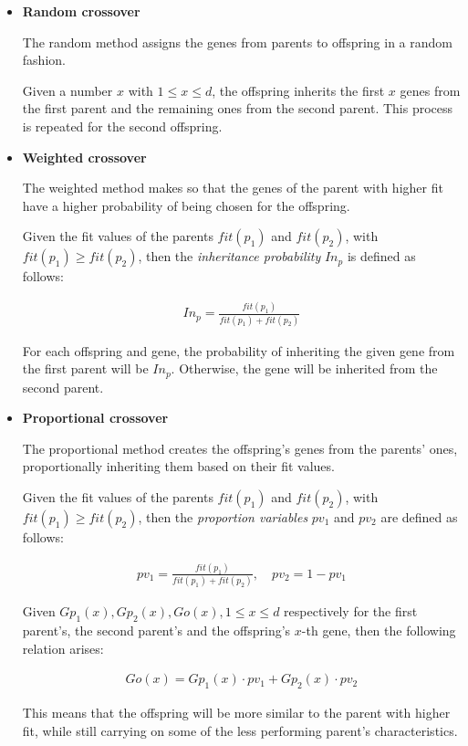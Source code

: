 \begin{itemize}[noitemsep]
	\item \textbf{Random crossover}
	
	The random method assigns the genes from parents to offspring in a random fashion.
	
	Given a number $x$ with $1 \le x \le d$,
	the offspring inherits the first $x$ genes from the first parent and
	the remaining ones from the second parent.
	This process is repeated for the second offspring.
	\item \textbf{Weighted crossover}
	
	The weighted method makes so that the genes of the parent with higher
	fit have a higher probability of being chosen for the offspring.
	
	Given the fit values of the parents $fit(p_1)$ and $fit(p_2)$,
	with $fit(p_1) \ge fit(p_2)$, then the \textit{inheritance probability} $In_p$
	is defined as follows:
	
	\begin{align*}
	In_p = \frac{fit(p_1)}{fit(p_1)+fit(p_2)}
	\end{align*}
	
	For each offspring and gene, the probability of inheriting the given gene
	from the first parent will be $In_p$. Otherwise, the gene will be inherited
	from the second parent.
	\item \textbf{Proportional crossover}
	
	The proportional method creates the offspring's genes from the parents' ones,
	proportionally inheriting them based on their fit values.
	
	Given the fit values of the parents $fit(p_1)$ and $fit(p_2)$,
	with $fit(p_1) \ge fit(p_2)$, then the \textit{proportion variables} $pv_1$
	and $pv_2$ are defined as follows:
		
	\begin{align*}
	pv_1 = \frac{fit(p_1)}{fit(p_1)+fit(p_2)},\quad pv_2 = 1-pv_1
	\end{align*}
	
	Given $Gp_1(x), Gp_2(x), Go(x), 1\le x\le d$
	respectively for the first parent's, the second parent's
	and the offspring's	$x$-th gene, then the following relation arises:
	
	\begin{align*}
		Go(x) = Gp_1(x)\cdot pv_1 + Gp_2(x) \cdot pv_2
	\end{align*}

	This means that the offspring will be more similar
	to the parent with higher fit, while still carrying on some of 
	the less performing parent's characteristics.
\end{itemize}



